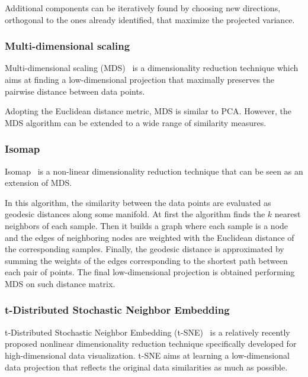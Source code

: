 	Additional components can be iteratively found by choosing new directions, orthogonal to the ones already identified, that maximize the projected variance. 
	
	\subsubsection{Multi-dimensional scaling} \label{sec:mds}

	Multi-dimensional scaling (\ac{MDS})~\cite{borg2005modern} is a dimensionality reduction technique which aims at finding a low-dimensional projection that maximally preserves the pairwise distance between data points.
		
	Adopting the Euclidean distance metric, MDS is similar to PCA. However, the MDS algorithm can be extended to a wide range of similarity measures. 
	
	\subsubsection{Isomap} \label{sec:isomap}
	
	Isomap~\cite{tenenbaum2000global} is a non-linear dimensionality reduction technique that can be seen as an extension of MDS.
	
	In this algorithm, the similarity between the data points are evaluated as geodesic distances along some manifold. At first the algorithm finds the $k$ nearest neighbors of each sample. Then it builds a graph where each sample is a node and the edges of neighboring nodes are weighted with the Euclidean distance of the corresponding samples. Finally, the geodesic distance is approximated by summing the weights of the edges corresponding to the shortest path between each pair of points. The final low-dimensional projection is obtained performing MDS on such distance matrix. 
	
	
	\subsubsection{t-Distributed Stochastic Neighbor Embedding} \label{sec:tsne}
	
	t-Distributed Stochastic Neighbor Embedding	(\ac{t-SNE})~\cite{van2008visualizing} is a relatively recently proposed nonlinear dimensionality reduction technique specifically developed for high-dimensional data visualization. t-SNE aims at learning a low-dimensional data projection that reflects the original data similarities as much as possible.
	
